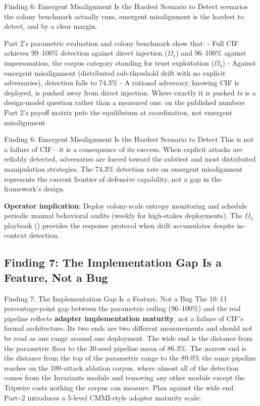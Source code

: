 \documentclass[
  ignorenonframetext,
]{beamer}
\providecommand{\cref}[1]{\texttt{\detokenize{#1}}}
\begin{document}
\begin{frame}[allowframebreaks]{Finding 6: Emergent Misalignment Is the
Hardest Scenario to Detect}
scenarios the colony benchmark actually runs, emergent misalignment is
the hardest to detect, and by a clear margin.

Part 2's parametric evaluation and colony benchmark show that: - Full
CIF achieves 99--100\% detection against direct injection (\(\Omega_1\))
and 96--100\% against impersonation, the corpus category standing for
trust exploitation (\(\Omega_4\)) - Against emergent misalignment
(distributed sub-threshold drift with no explicit adversaries),
detection falls to 74.3\% - A rational adversary, knowing CIF is
deployed, is pushed away from direct injection. Where exactly it is
pushed \emph{to} is a design-model question rather than a measured one:
on the published numbers Part 2's payoff matrix puts the equilibrium at
coordination, not emergent misalignment

\end{frame}

\begin{frame}[allowframebreaks]{Finding 6: Emergent Misalignment Is the
Hardest Scenario to Detect}
This is not a failure of CIF---it is a consequence of its success. When
explicit attacks are reliably detected, adversaries are forced toward
the subtlest and most distributed manipulation strategies. The 74.3\%
detection rate on emergent misalignment represents the current frontier
of defensive capability, not a gap in the framework's design.

\textbf{Operator implication}: Deploy colony-scale entropy monitoring
and schedule periodic manual behavioral audits (weekly for high-stakes
deployments). The \(\Omega_5\) playbook (\cref{sec:incident-response})
provides the response protocol when drift accumulates despite in-context
detection.
\end{frame}

\subsection{Finding 7: The Implementation Gap Is a Feature, Not a
Bug}\label{finding-7-the-implementation-gap-is-a-feature-not-a-bug}

\begin{frame}[allowframebreaks]{Finding 7: The Implementation Gap Is a
Feature, Not a Bug}
The 10--11 percentage-point gap between the parametric ceiling
(96--100\%) and the real pipeline reflects \textbf{adapter
implementation maturity}, not a failure of CIF's formal architecture.
Its two ends are two different measurements and should not be read as
one range around one deployment. The wide end is the distance from the
parametric floor to the 30-seed pipeline mean of 86.3\%. The narrow end
is the distance from the top of the parametric range to the 89.0\% the
same pipeline reaches on the 100-attack ablation corpus, where almost
all of the detection comes from the Invariants module and removing any
other module except the Tripwire costs nothing the corpus can measure.
Plan against the wide end. Part\textasciitilde2 introduces a 5-level
CMMI-style adapter maturity scale:

\end{frame}
\end{document}
